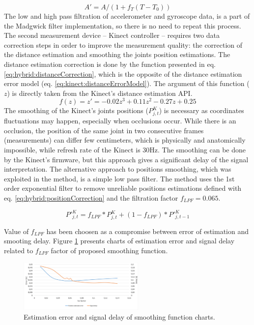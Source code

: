 \documentclass[sensors,article,submit,moreauthors,pdftex,10pt,a4paper]{mdpi}
\begin{document}
\begin{equation}
	A'=A/(1+ f_T (T-T_0))
	\label{eq:hybrid:tempCorrection}
\end{equation}
The low and high pass filtration of accelerometer and gyroscope data, is a part of the Madgwick filter implementation, so there is no need to repeat this process.
The second measurement device – Kinect controller – requires two data correction steps in order to improve the measurement quality: the correction of the distance estimation and smoothing the joints position estimations. The distance estimation correction is done by the function presented in eq. \ref{eq:hybrid:distanceCorrection}, which is the opposite of the distance estimation error model (eq. \ref{eq:kinect:distanceErrorModel}). The argument of this function ($z$) is directly taken from the Kinect’s distance estimation API.
\begin{equation}
	f(z)=z'=-0.02z^3+0.11z^2-0.27z+0.25
	\label{eq:hybrid:distanceCorrection}
\end{equation}
The smoothing of the Kinect’s joints positions ($P_{j,t}^K$) is necessary as coordinates fluctuations may happen, especially when occlusions occur. While there is an occlusion, the position of the same joint in two consecutive frames (measurements) can differ few centimeters, which is physically and anatomically impossible, while refresh rate of the Kinect is 30Hz. The smoothing can be done by the Kinect’s firmware, but this approach gives a significant delay of the signal interpretation. The alternative approach to positions smoothing, which was exploited in the method, is a simple low pass filter. The method uses the 1st order exponential filter to remove unreliable positions estimations defined with eq. \ref{eq:hybrid:positionCorrection} and the filtration factor $f_{LPF} = 0.065$. 

\begin{equation}
	{P'}_{j,t}^K=f_{LPF} * P_{j,t}^K+(1-f_{LPF}) * {P'}_{j,t-1}^K
	\label{eq:hybrid:positionCorrection}
\end{equation}

Value of $f_{LPF}$ has been choosen as a compromise between error of estimation and smooting delay. Figure \ref{fig:lpf:factor} presents charts of estimation error and signal delay related to $f_{LPF}$ factor of proposed smoothing function.

\begin{figure}[!htb] %
	\centering
	\includegraphics[width=0.55\textwidth]{Figure12}
	\caption{Estimation error and signal delay of smoothing function charts.}
	\label{fig:lpf:factor}
\end{figure}
		
\end{document}
